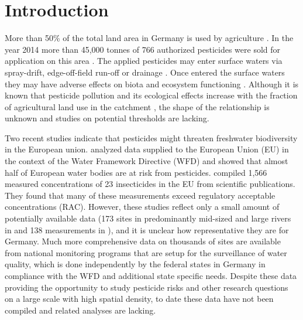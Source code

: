 \documentclass[journal=esthag,manuscript=article]{achemso}
\begin{document}
\section{Introduction}
More than 50\% of the total land area in Germany is used by agriculture \citep{statistisches_bundesamt_bodenflache_2014}.
In the year 2014 more than 45,000 tonnes of 766 authorized pesticides were sold for application on this area \citep{bundesamt_fur_verbraucherschutz_und_lebensmittelsicherheit_absatz_2015}.
The applied pesticides may enter surface waters via spray-drift, edge-off-field run-off or drainage \citep{stehle_probabilistic_2013,schulz_comparison_2001,liess_determination_1999}.
Once entered the surface waters they may have adverse effects on biota and ecosystem functioning \citep{schafer_thresholds_2012}. 
Although it is known that pesticide pollution and its ecological effects increase with the fraction of agricultural land use in the catchment \citep{schulz_field_2004}, the shape of the relationship is unknown and studies on potential thresholds are lacking.

Two recent studies indicate that pesticides might threaten freshwater biodiversity in the European union. 
\citet{malaj_organic_2014} analyzed data supplied to the European Union (EU) in the context of the Water Framework Directive (WFD) and showed that almost half of European water bodies are at risk from pesticides.
\citet{stehle_pesticide_2015} compiled 1,566 measured concentrations of 23 insecticides in the EU from scientific publications. 
They found that many of these measurements exceed regulatory acceptable concentrations (RAC). 
However, these studies reflect only a small amount of potentially available data (173 sites in predominantly mid-sized and large rivers in \citet{malaj_organic_2014} and 138 measurements in \citet{stehle_pesticide_2015}), and it is unclear how representative they are for Germany. %
Much more comprehensive data on thousands of sites are available from national monitoring programs that are setup for the surveillance of water quality, which is done independently by the federal states in Germany in compliance with the WFD \citep{quevauviller_water_2008} and additional state specific needs. 
Despite these data providing the opportunity to study pesticide risks and other research questions on a large scale with high spatial density, to date these data have not been compiled and related analyses are lacking.
\end{document}
